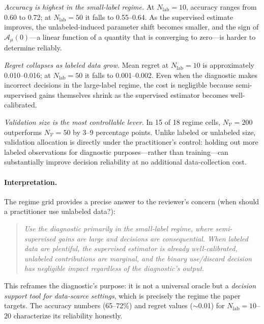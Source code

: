 \documentclass[11pt]{article}
\theoremstyle{definition}
\newcommand{\calA}{\mathcal{A}}
\begin{document}
\emph{Accuracy is highest in the small-label regime.}
At \(N_{\mathrm{lab}}=10\), accuracy ranges from 0.60 to 0.72;
at \(N_{\mathrm{lab}}=50\) it falls to 0.55--0.64.
As the supervised estimate improves, the unlabeled-induced
parameter shift becomes smaller, and the sign of \(\hat{\calA}_\mu(0)\)---a
linear function of a quantity that is converging to zero---is harder to
determine reliably.

\emph{Regret collapses as labeled data grow.}
Mean regret at \(N_{\mathrm{lab}}=10\) is approximately 0.010--0.016;
at \(N_{\mathrm{lab}}=50\) it falls to 0.001--0.002.
Even when the diagnostic makes incorrect decisions in the large-label
regime, the cost is negligible because semi-supervised gains themselves
shrink as the supervised estimator becomes well-calibrated.

\emph{Validation size is the most controllable lever.}
In 15 of 18 regime cells, \(N_{\mathcal{V}}=200\) outperforms
\(N_{\mathcal{V}}=50\) by 3--9 percentage points.
Unlike labeled or unlabeled size, validation allocation is directly under
the practitioner's control: holding out more labeled observations for
diagnostic purposes---rather than training---can substantially improve
decision reliability at no additional data-collection cost.

\paragraph{Interpretation.}
The regime grid provides a precise answer to the reviewer's concern
(when should a practitioner use unlabeled data?):

\begin{quote}
\emph{Use the diagnostic primarily in the small-label regime, where
semi-supervised gains are large and decisions are consequential.
When labeled data are plentiful, the supervised estimator is already
well-calibrated, unlabeled contributions are marginal, and the binary
use/discard decision has negligible impact regardless of the diagnostic's
output.}
\end{quote}

This reframes the diagnostic's purpose:
it is not a universal oracle but a \emph{decision support tool for
data-scarce settings}, which is precisely the regime the paper targets.
The accuracy numbers (65--72\%) and regret values ($\sim$0.01) for
\(N_{\mathrm{lab}}=10\)--20 characterize its reliability honestly.
\end{document}
